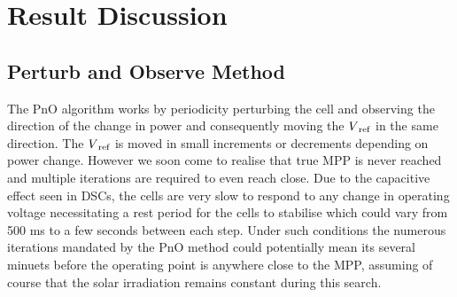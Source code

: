 \chapter{Result Discussion}
 
 \section{Perturb and Observe Method }
 
 The \ac{PnO} algorithm works by periodicity perturbing the cell and observing the direction of the change in power and consequently moving the $V\textsubscript{ref}$ in the same direction. The $V\textsubscript{ref}$ is moved in small increments or decrements depending on power change.
 However we soon come to realise that true \ac{MPP} is never reached and multiple iterations are required to even reach close. Due to the capacitive effect seen in \ac{DSCs}, the cells are very slow to respond to any change in operating voltage necessitating a rest period for the cells to stabilise which could vary from 500 ms to a few seconds between each step. Under such conditions the numerous iterations mandated by the \ac{PnO} method could potentially mean its several minuets before the operating point is anywhere close to the \ac{MPP}, assuming of course that the solar irradiation remains constant during this search. 
 
